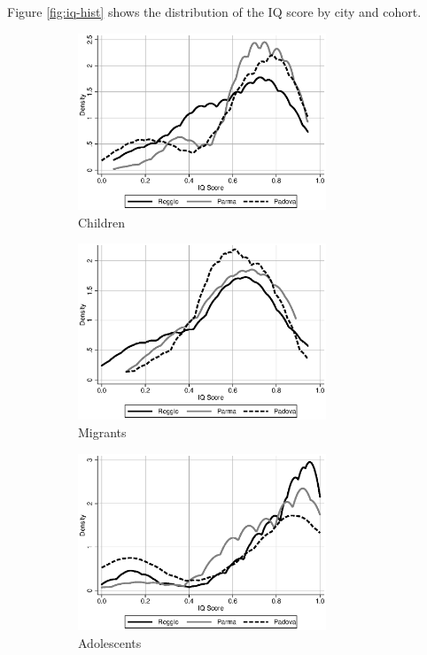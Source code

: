 Figure \ref{fig:iq-hist} shows the distribution of the IQ score by city and cohort. 

\begin{figure}[H]
	\begin{center}
	\caption{Densities of IQ Scores}\label{fig:iq-hist}
	\begin{subfigure}{.5\textwidth}
		\centering
		\includegraphics[width=20em]{../../../../Output/IQ_hist_1}
		\caption{Children}
	\end{subfigure}%
	\begin{subfigure}{.5\textwidth}
		\centering
		\includegraphics[width=20em]{../../../../Output/IQ_hist_2}
		\caption{Migrants}
	\end{subfigure}
	\begin{subfigure}{.5\textwidth}
		\centering
		\includegraphics[width=20em]{../../../../Output/IQ_hist_3}
		\caption{Adolescents}
	\end{subfigure}%
	\begin{subfigure}{.5\textwidth}

\end{subfigure}
\end{center}
\end{figure}
